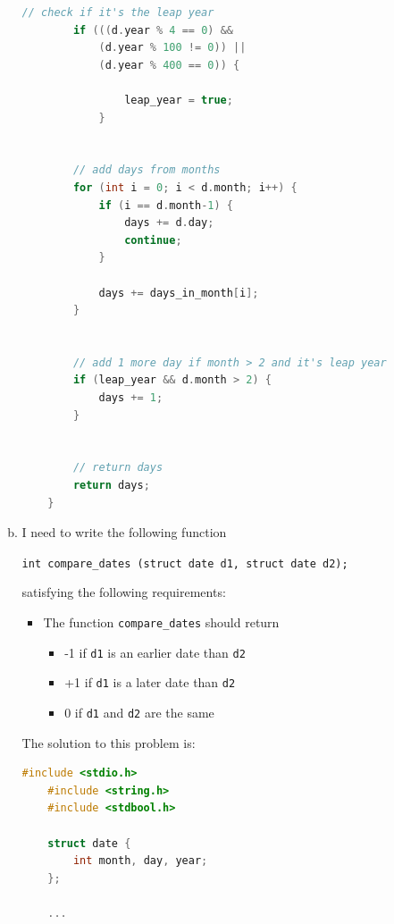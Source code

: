 \documentclass[12pt]{article}
\begin{document}
\begin{enumerate}[1.]
\begin{enumerate}[a)]
\begin{lstlisting}[language=c]
        // check if it's the leap year
        if (((d.year % 4 == 0) &&
            (d.year % 100 != 0)) ||
            (d.year % 400 == 0)) {

                leap_year = true;
            }


        // add days from months
        for (int i = 0; i < d.month; i++) {
            if (i == d.month-1) {
                days += d.day;
                continue;
            }

            days += days_in_month[i];
        }


        // add 1 more day if month > 2 and it's leap year
        if (leap_year && d.month > 2) {
            days += 1;
        }


        // return days
        return days;
    }
\end{lstlisting}

        \item

        I need to write the following function

        \bigskip

        \texttt{int compare\_dates (struct date d1, struct date d2);}

        \bigskip

        satisfying the following requirements:

        \begin{itemize}
            \item The function \texttt{compare\_dates} should return
            \begin{itemize}
                \item -1 if \texttt{d1} is an earlier date than \texttt{d2}
                \item +1 if \texttt{d1} is a later date than \texttt{d2}
                \item 0 if \texttt{d1} and \texttt{d2} are the same
            \end{itemize}
        \end{itemize}

        \bigskip

        The solution to this problem is:

\begin{lstlisting}[language=c]
    #include <stdio.h>
    #include <string.h>
    #include <stdbool.h>

    struct date {
        int month, day, year;
    };

    ...


\end{lstlisting}
\end{enumerate}
\end{enumerate}
\end{document}
